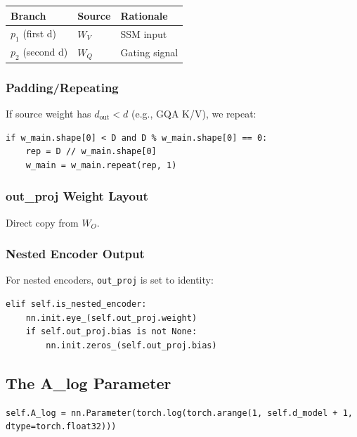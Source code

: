 \begin{table}[H]
\centering
\small
\begin{tabular}{lll}
\toprule
\textbf{Branch} & \textbf{Source} & \textbf{Rationale} \\
\midrule
$p_1$ (first d) & $W_V$ & SSM input \\
$p_2$ (second d) & $W_Q$ & Gating signal \\
\bottomrule
\end{tabular}
\end{table}

\subsubsection{Padding/Repeating}

If source weight has $d_\text{out} < d$ (e.g., GQA K/V), we repeat:

\begin{lstlisting}
if w_main.shape[0] < D and D % w_main.shape[0] == 0:
    rep = D // w_main.shape[0]
    w_main = w_main.repeat(rep, 1)
\end{lstlisting}

\subsubsection{out\_proj Weight Layout}

Direct copy from $W_O$.

\subsubsection{Nested Encoder Output}

For nested encoders, \texttt{out\_proj} is set to identity:

\begin{lstlisting}
elif self.is_nested_encoder:
    nn.init.eye_(self.out_proj.weight)
    if self.out_proj.bias is not None:
        nn.init.zeros_(self.out_proj.bias)
\end{lstlisting}

\subsection{The A\_log Parameter}

\begin{lstlisting}
self.A_log = nn.Parameter(torch.log(torch.arange(1, self.d_model + 1, dtype=torch.float32)))
\end{lstlisting}

